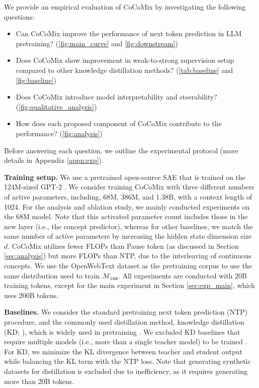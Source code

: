 \documentclass[]{fairmeta}
\newcommand{\sname}{CoCoMix\xspace}
\begin{document}
We provide an empirical evaluation of \sname by investigating the following questions:
\begin{itemize}[leftmargin=*,topsep=0.0pt,itemsep=.5pt]
\item Can \sname improve the performance of next token prediction in LLM pretraining? (\autoref{fig:main_curve} and \autoref{fig:downstream})
\item Does \sname show improvement in weak-to-strong supervision setup compared to other knowledge distillation methods? (\autoref{tab:baseline} and \autoref{fig:baseline})
\item Does \sname introduce model interpretability and steerability? (\autoref{fig:qualitative_analysis})
\item How does each proposed component of \sname contribute to the performance? (\autoref{fig:analysis})
\end{itemize}

Before answering each question, we outline the experimental protocol (more details in Appendix \ref{appn:exp}). 

\textbf{Training setup.} We use a pretrained open-source SAE that is trained on the 124M-sized GPT-2  \citep{gao2024scaling}. We consider training \sname with three different numbers of active parameters, including, 68M, 386M, and 1.38B, with a context length of 1024. For the analysis and ablation study, we mainly conducted experiments on the 68M model. Note that this activated parameter count includes those in the new layer (i.e., the concept predictor), whereas for other baselines, we match the same number of active parameters by increasing the hidden state dimension size $d$. \sname utilizes fewer FLOPs than Pause token (as discussed in Section \ref{sec:analysis}) but more FLOPs than NTP, due to the interleaving of continuous concepts. We use the OpenWebText dataset \citep{radford2019language} as the pretraining corpus to use the same distribution used to train $\mathcal{M}_{\mathtt{con}}$. All experiments are conducted with 20B training tokens, except for the main experiment in Section \ref{sec:exp_main}, which uses 200B tokens.

\textbf{Baselines.} We consider the standard pretraining next token prediction (NTP) procedure, and the commonly used distillation method, knowledge distillation (KD; \citealp{hinton2015distilling}), which is widely used in pretraining \citep{gu2024miniplm, sanh2019distilbert,team2024gemma}. We excluded KD baselines that require multiple models (i.e., more than a single teacher model) to be trained \citep{gu2024miniplm}. For KD, we minimize the KL divergence between teacher and student output while balancing the KL term with the NTP loss. Note that generating synthetic datasets for distillation \citep{kim2016sequence,yu2024distilling} is excluded due to inefficiency, as it requires generating more than 20B tokens. 
\end{document}
